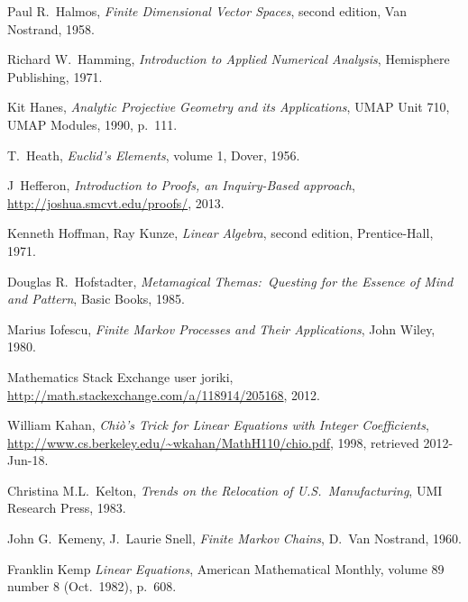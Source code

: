 \begin{thebibliography}{\makebox[2em][c]{{}\hfil{}}}
  Paul R.~Halmos,
  \emph{Finite Dimensional Vector Spaces},
  second edition,
  Van Nostrand,
  1958.


  Richard W.\ Hamming,
  \emph{Introduction to Applied Numerical Analysis},
  Hemisphere Publishing,
  1971.

  Kit Hanes,
  \emph{Analytic Projective Geometry and its Applications},
  UMAP Unit 710,
  UMAP Modules, 1990,
  p.~111.

  T.\ Heath,
  \emph{Euclid's Elements},
  volume 1,
  Dover,
  1956.

  J~Hef{}feron,
  \emph{Introduction to Proofs, an Inquiry-Based approach},
  \url{http://joshua.smcvt.edu/proofs/},
  2013.

  Kenneth Hoffman, Ray Kunze,
  \emph{Linear Algebra},
  second edition,
  Prentice-Hall,
  1971.

 Douglas R.~Hofstadter,
 \emph{Metamagical Themas:~Questing for the Essence of Mind and Pattern},
 Basic Books,
 1985.

  Marius Iofescu,
  \emph{Finite Markov Processes and Their Applications},
  John Wiley, 1980.

  Mathematics Stack Exchange user joriki,
  \url{http://math.stackexchange.com/a/118914/205168},
  2012.

  William Kahan,
  \emph{Chi\`{o}'s Trick  for  Linear Equations  with  Integer Coefficients},
  \url{http://www.cs.berkeley.edu/~wkahan/MathH110/chio.pdf}, 1998,
  retrieved 2012-Jun-18.

  Christina M.L.~Kelton,
  \emph{Trends on the Relocation of U.S.\ Manufacturing},
  UMI Research Press, 1983.

  John G.~Kemeny, J.~Laurie Snell,
  \emph{Finite Markov Chains},
  D.~Van Nostrand, 1960.

  Franklin Kemp
  \emph{Linear Equations},
  American Mathematical Monthly,
  volume 89 number 8 (Oct.\ 1982),
  p.~608.



\end{thebibliography}
